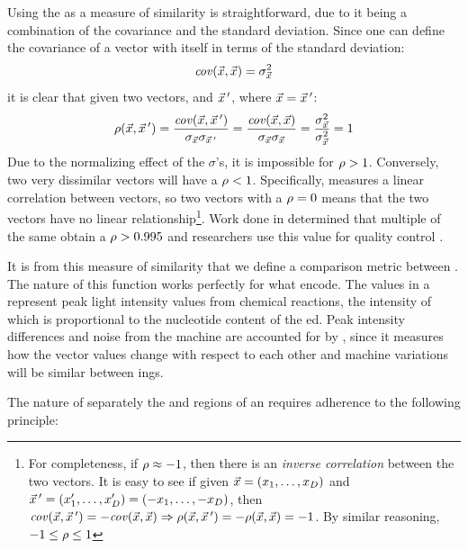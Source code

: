 Using the \pearson{} as a measure of similarity is straightforward, due to it being a combination of the covariance and the standard deviation.
Since one can define the covariance of a vector with itself in terms of the standard deviation:
\begin{equation}
    \mathit{cov}(\vec{x{}}, \vec{x{}}) = \sigma_{\vec{x{}}}^2
\end{equation}
it is clear that given two vectors, \pcveca{} and $\vec{x}{}\,'$, where $\vec{x}{} = \vec{x}\,'{}$:
\begin{equation}
    \rho({\vec{x}{}},{\vec{x}\,'{}})
    = \frac{\mathit{cov}(\vec{x}{}, \vec{x}\,'{})}{\sigma_{\vec{x}{}}\sigma_{\vec{x}\,'{}}}
    = \frac{\mathit{cov}(\vec{x}{}, \vec{x}{})}{\sigma_{\vec{x}{}}\sigma_{\vec{x}{}}}
    = \frac{\sigma_{\vec{x}{}}^2}{\sigma_{\vec{x}{}}^2}
    = 1
\end{equation}
Due to the normalizing effect of the $\sigma{}$'s, it is impossible for $\rho{} > 1$.
Conversely, two very dissimilar vectors will have a $\rho{} < 1$.
Specifically, \pearson{} measures a linear correlation between vectors, so two vectors with a $\rho{} = 0$ means that the two vectors have no linear relationship\footnote{For completeness, if $\rho{} \approx -1$, then there is an \textit{inverse correlation} between the two vectors. It is easy to see if 
given $\vec{x}{} = (x{}_1,\dots,x{}_{D}{})$
and $\vec{x}\,'{}=(x{}'_1,\dots,x{}'_{D}{}) = (-x{}_1,\dots,-x{}_{D}{})$,
then $\mathit{cov}(\vec{x}{}, \vec{x}\,'{}) = -\mathit{cov}(\vec{x{}}, \vec{x{}})\Rightarrow\rho{(\ensuremath{\vec{x}}{}, \ensuremath{\vec{x}\,'}{}) = -\ensuremath{\rho{}(\vec{x{}}, \vec{x{}})}} = -1$. By similar reasoning, $-1 \leq \rho{} \leq 1$
}.
Work done in \cite{Shealy:SeniorProject} determined that multiple \pyros{} of the same \isol{} obtain a $\rho{} > 0.995$ and \cplop{} researchers use this value for quality control \cite{kent2014pyroprinting, Black2014121}.

It is from this measure of similarity \pcfunclabel{} that we define a comparison metric between \pyros{}.
The nature of this function works perfectly for what \pyros{} encode.
The values in a \pyro{} represent peak light intensity values from chemical reactions, the intensity of which is proportional to the nucleotide content of the \dna{} \pyro{}ed.
Peak intensity differences and noise from the machine are accounted for by \pearson{}, since it measures how the \pyro{} vector values change with respect to each other and machine variations will be similar between \pyro{}ings.

The nature of separately \pyro{} the \Ssixt{} and \Sfive{} regions of an \isol{} requires adherence to the following principle:

